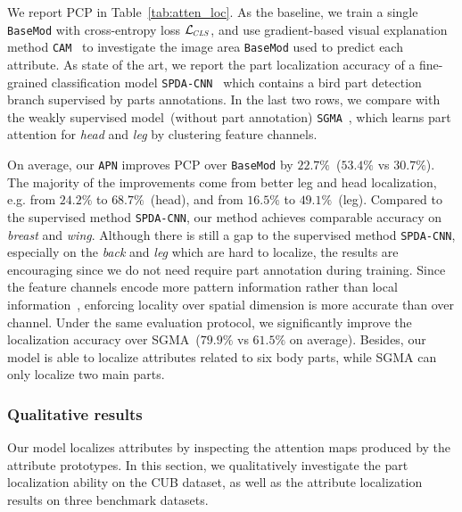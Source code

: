 We report PCP in Table~\ref{tab:atten_loc}.
As the baseline, we train a single \texttt{BaseMod} with cross-entropy loss $\mathcal{L}_{\Scale[0.6]{CLS}}$, 
and use gradient-based visual explanation method \texttt{CAM}~\citep{CAM} to investigate the image area \texttt{BaseMod} used to predict each attribute. As state of the art, we report the part localization accuracy of a fine-grained classification model \texttt{SPDA-CNN}~\citep{spdacnn} which contains a bird part detection branch supervised by parts annotations. In the last two rows, we compare with the weakly supervised model~(without part annotation) \texttt{SGMA}~\citep{SGMA}, which learns part attention for \textit{head} and \textit{leg} by clustering feature channels.

On average, our \texttt{APN} improves PCP over \texttt{BaseMod} by $22.7\%$~($53.4\%$ vs $30.7\%$). The majority of the improvements come from better leg and head localization, e.g. from $24.2\%$ to $68.7\%$~(head), and from $16.5\%$ to $49.1\%$~(leg). Compared to the supervised method \texttt{SPDA-CNN}, our method achieves comparable accuracy on \textit{breast} and \textit{wing}. Although there is still a gap to the supervised method \texttt{SPDA-CNN}, especially on the \textit{back} and \textit{leg} which are hard to localize, the results are encouraging since we do not need require part annotation during training.
Since the feature channels encode more pattern information rather than local information~\citep{geirhos2018imagenet,zhou2018interpreting}, enforcing locality over spatial dimension is more accurate than over channel. Under the same evaluation protocol, we significantly improve the localization accuracy over SGMA~($79.9\%$ vs $61.5\%$ on average). Besides, our model is able to localize attributes related to six body parts, while SGMA can only localize two main parts. 













\subsubsection{Qualitative results}
Our model localizes attributes by inspecting the attention maps produced by the attribute prototypes. In this section, we qualitatively investigate the part localization ability on the CUB dataset, as well as the attribute localization results on three benchmark datasets.

